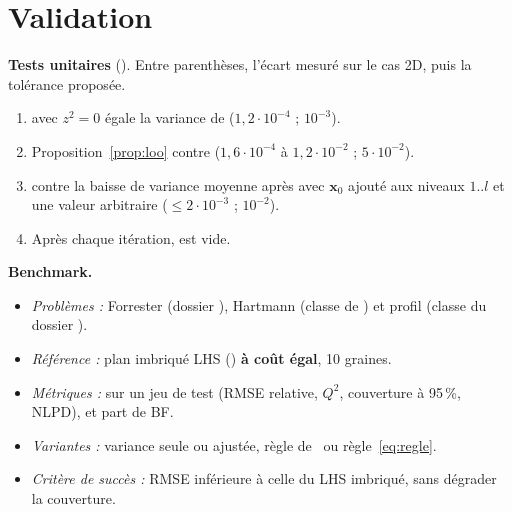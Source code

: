 \documentclass[10pt,a4paper]{article}
\theoremstyle{plain}
\newcommand{\vx}{\bm{x}}
\begin{document}
\section{Validation}\label{sec:valid}
\textbf{Tests unitaires} (). Entre parenthèses, l'écart mesuré sur le cas 2D, puis la tolérance
proposée.
\begin{enumerate}
  \item {} avec $z^2=0$ égale la variance de
         ($1{,}2\cdot10^{-4}$ ; $10^{-3}$).
  \item Proposition~\ref{prop:loo} contre 
        ($1{,}6\cdot10^{-4}$ à $1{,}2\cdot10^{-2}$ ; $5\cdot10^{-2}$).
  \item {} contre la baisse de variance moyenne après  avec $\vx_0$ ajouté aux
        niveaux $1..l$ et une valeur arbitraire ($\le2\cdot10^{-3}$ ; $10^{-2}$).
  \item Après chaque itération,  est vide.
\end{enumerate}
\textbf{Benchmark.}
\begin{itemize}
  \item \emph{Problèmes :} Forrester (dossier ), Hartmann (classe  de
        ) et profil (classe  du dossier ).
  \item \emph{Référence :} plan imbriqué LHS () \textbf{à coût égal}, 10 graines.
  \item \emph{Métriques :}  sur un jeu de test (RMSE relative, $Q^2$,
        couverture à 95\,\%, NLPD), et part de BF.
  \item \emph{Variantes :} variance seule ou ajustée, règle de~\cite{LGC15} ou règle~\eqref{eq:regle}.
  \item \emph{Critère de succès :} RMSE inférieure à celle du LHS imbriqué, sans dégrader la couverture.
\end{itemize}

\end{document}
